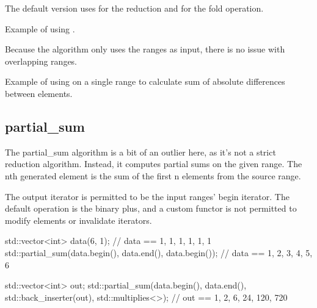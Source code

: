 The default version uses  for the reduction and  for the fold operation.

\begin{box-note}
\footnotesize Example of using .
\tcblower
{}
\end{box-note}

Because the algorithm only uses the ranges as input, there is no issue with overlapping ranges.

\begin{box-note}
\footnotesize Example of using  on a single range to calculate sum of absolute differences between elements.
\tcblower
{}
\end{box-note}

\subsection{partial\_sum}

The partial\_sum algorithm is a bit of an outlier here, as it’s not a strict reduction algorithm. Instead, it computes partial sums on the given range. The nth generated element is the sum of the first n elements from the source range.



The output iterator is permitted to be the input ranges’ begin iterator. The default operation is the binary plus, and a custom functor is not permitted to modify elements or invalidate iterators.

\begin{box-note}
\begin{cppcode}
std::vector<int> data(6, 1);
// data == {1, 1, 1, 1, 1, 1}
std::partial_sum(data.begin(), data.end(), data.begin());
// data == {1, 2, 3, 4, 5, 6}

std::vector<int> out;
std::partial_sum(data.begin(), data.end(), std::back_inserter(out), std::multiplies<>{});
// out == {1, 2, 6, 24, 120, 720}
\end{cppcode}
\end{box-note}
